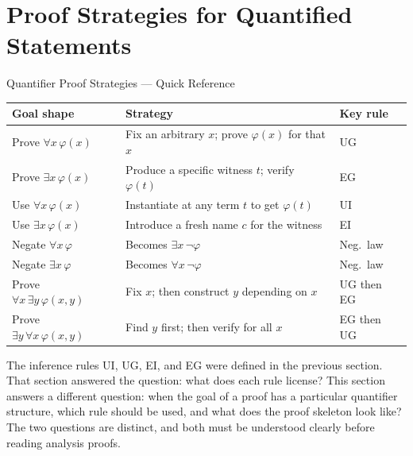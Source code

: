 
\section{Proof Strategies for Quantified Statements}

\begin{toolkitbox}{Quantifier Proof Strategies — Quick Reference}
\small
\begin{tabular}{l l l}
\toprule
\textbf{Goal shape} & \textbf{Strategy} & \textbf{Key rule} \\
\midrule
Prove $\forall x\,\varphi(x)$  & Fix an arbitrary $x$; prove $\varphi(x)$ for that $x$  & UG \\
Prove $\exists x\,\varphi(x)$  & Produce a specific witness $t$; verify $\varphi(t)$     & EG \\
Use $\forall x\,\varphi(x)$    & Instantiate at any term $t$ to get $\varphi(t)$         & UI \\
Use $\exists x\,\varphi(x)$    & Introduce a fresh name $c$ for the witness             & EI \\
Negate $\forall x\,\varphi$    & Becomes $\exists x\,\neg\varphi$                        & Neg.\ law \\
Negate $\exists x\,\varphi$    & Becomes $\forall x\,\neg\varphi$                        & Neg.\ law \\
\midrule
Prove $\forall x\,\exists y\,\varphi(x,y)$ & Fix $x$; then construct $y$ depending on $x$ & UG then EG \\
Prove $\exists y\,\forall x\,\varphi(x,y)$ & Find $y$ first; then verify for all $x$       & EG then UG \\
\bottomrule
\end{tabular}
\end{toolkitbox}


\begin{exposition}
The inference rules UI, UG, EI, and EG were defined in the previous section.
That section answered the question: what does each rule license? This section
answers a different question: when the goal of a proof has a particular
quantifier structure, which rule should be used, and what does the proof
skeleton look like? The two questions are distinct, and both must be understood
clearly before reading analysis proofs.
\end{exposition}

